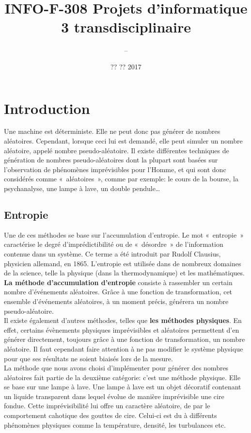 \documentclass[a4paper, 10pt, titlepage]{report}
\title{INFO-F-308 Projets d'informatique 3 transdisciplinaire}
\author{--}
\date{?? ?? 2017}
\begin{document}
\maketitle

\tableofcontents

\chapter{Introduction}

Une machine est déterministe. Elle ne peut donc pas générer de nombres aléatoires. Cependant, lorsque ceci lui est demandé, elle peut simuler un nombre aléatoire, appelé nombre pseudo-aléatoire. Il existe différentes techniques de génération de nombres pseudo-aléatoires dont la plupart sont basées sur l’observation de phénomènes imprévisibles pour l’Homme, et qui sont donc considérés comme « aléatoires », comme par exemple: le cours de la bourse, la psychanalyse, une lampe à lave, un double pendule… \\

\section*{Entropie}

Une de ces méthodes se base sur l’accumulation d’entropie. Le mot « entropie » caractérise le degré d’imprédictibilité ou de « désordre » de l’information contenue dans un système. Ce terme a été introduit par Rudolf Clausius, physicien allemand, en 1865. L'entropie est utilisée dans de nombreux domaines de la science, telle la physique (dans la thermodynamique) et les mathématiques. \\

\textbf{La méthode d’accumulation d’entropie} consiste à rassembler un certain nombre d’événements aléatoires. Grâce à une fonction de transformation, cet ensemble d’événements aléatoires, à un moment précis, générera un nombre pseudo-aléatoire. \\

Il existe également d’autres méthodes, telles que \textbf{les méthodes physiques}. En effet, certains évènements physiques imprévisibles et aléatoires permettent d'en générer directement, toujours grâce à une fonction de transformation, un nombre aléatoire. Il faut cependant faire attention à ne pas modifier le système physique pour que ses résultats ne soient biaisés lors de la mesure. \\ 

La méthode que nous avons choisi d'implémenter pour générer des nombres aléatoires fait partie de la deuxième catégorie: c'est une méthode physique. Elle se base sur une lampe à lave. Une lampe à lave est un objet décoratif contenant un liquide transparent dans lequel évolue de manière imprévisible une cire fondue. Cette imprévisibilité lui offre un caractère aléatoire, de par le comportement cahotique des gouttes de cire. Celui-ci est du à différents phénomènes physiques comme la température, densité, les turbulances etc.  
\end{document}
